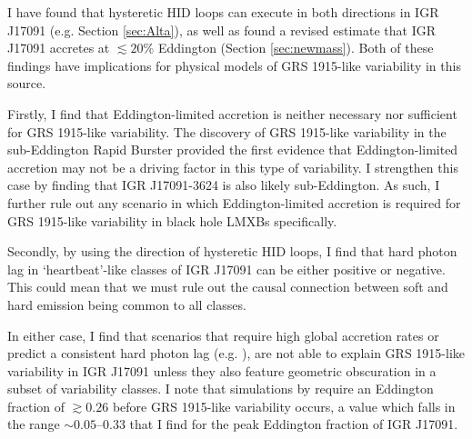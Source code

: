 \par I have found that hysteretic HID loops can execute in both directions in IGR J17091 (e.g. Section \ref{sec:Alta}), as well as found a revised estimate that IGR J17091 accretes at $\lesssim20$\% Eddington (Section \ref{sec:newmass}).  Both of these findings have implications for physical models of GRS 1915-like variability in this source.
\par Firstly, I find that Eddington-limited accretion is neither necessary nor sufficient for GRS 1915-like variability.  The discovery of GRS 1915-like variability in the sub-Eddington Rapid Burster \citep{Bagnoli_RB,Bagnoli_PopStudy} provided the first evidence that Eddington-limited accretion may not be a driving factor in this type of variability.  I strengthen this case by finding that IGR J17091-3624 is also likely sub-Eddington.  As such, I further rule out any scenario in which Eddington-limited accretion is required for GRS 1915-like variability in black hole LMXBs specifically.
\par Secondly, by using the direction of hysteretic HID loops, I find that hard photon lag in `heartbeat'\indexrho-like classes of IGR J17091 can be either positive or negative.  This could mean that we must rule out the causal connection between soft and hard emission being common to all classes.
\par In either case, I find that scenarios that require high global accretion rates or predict a consistent hard photon lag (e.g. \citealp{Neilsen_GRSModel,Janiuk_Lag}), are not able to explain GRS 1915-like variability in IGR J17091 unless they also feature geometric obscuration in a subset of variability classes.  I note that simulations by \citealp{Nayakshin_GRSModel} require an Eddington fraction of $\gtrsim0.26$ before GRS 1915-like variability occurs, a value which falls in the range $\sim0.05\mbox{--}0.33$ that I find for the peak Eddington fraction of IGR J17091.
